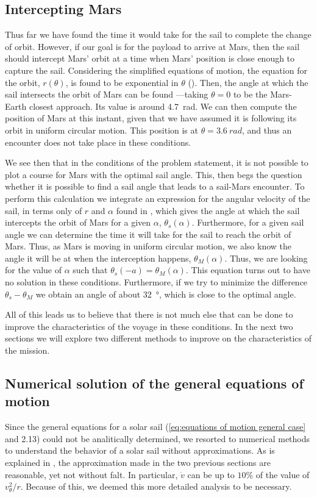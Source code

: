 \documentclass[twocolumn,12pt,a4paper]{article}
\numberwithin{equation}{section}
\begin{document}
\subsection{Intercepting Mars}

Thus far we have found the time it would take for the sail to complete the change of orbit. However, if our goal is for the payload to arrive at Mars, then the sail should intercept Mars' orbit at a time when Mars' position is close enough to capture the sail. Considering the simplified equations of motion, the equation for the orbit, \( r(\theta) \), is found to be exponential in \( \theta \) (\cite[p. 155]{mcinnes}). Then, the angle at which the sail intersects the orbit of Mars can be found ---taking \( \theta = 0	\) to be the Mars-Earth closest approach. Its value is around \SI{4.7}{rad}. We can then compute the position of Mars at this instant, given that we have assumed it is following its orbit in uniform circular motion. This position is at \( \theta = \SI{3.6}{rad} \), and thus an encounter does not take place in these conditions. 

We see then that in the conditions of the problem statement, it is not possible to plot a course for Mars with the optimal sail angle. This, then begs the question whether it is possible to find a sail angle that leads to a sail-Mars encounter. To perform this calculation we integrate an expression for the angular velocity of the sail, in terms only of \( r \) and \( \alpha \) found in \cite[p. 156]{mcinnes}, which gives the angle at which the sail intercepts the orbit of Mars for a given \( \alpha \), \( \theta_s(\alpha) \). Furthermore, for a given sail angle we can determine the time it will take for the sail to reach the orbit of Mars. Thus, as Mars is moving in uniform circular motion, we also know the angle it will be at when the interception happens, \( \theta_M(\alpha) \). Thus, we are looking for the value of \( \alpha \) such that \( \theta_s(-a) = \theta_M(\alpha) \). This equation turns out to have no solution in these conditions. Furthermore, if we try to minimize the difference \( \theta_s - \theta_M \) we obtain an angle of about \SI{32}{\degree}, which is close to the optimal angle.

All of this leads us to believe that there is not much else that can be done to improve the characteristics of the voyage in these conditions. In the next two sections we will explore two different methods to improve on the characteristics of the mission.

\subsection{Numerical solution of the general equations of motion}
Since the general equations for a solar sail (\autoref{eq:equations of motion general case} and 2.13) could not be analitically determined, we resorted to numerical methods to understand the behavior of a solar sail without approximations. As is explained in \cite{tsu}, the approximation made in the two previous sections are reasonable, yet not without falt. In particular, \( \dot{v} \) can be up to \( 10 \% \) of the value of \( v_{\theta}^2/r \). Because of this, we deemed this more detailed analysis to be necessary. 
\end{document}
